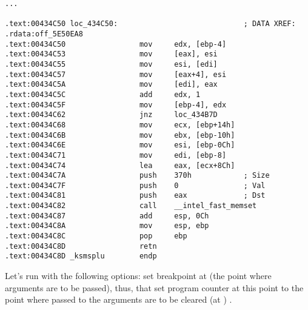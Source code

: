 \begin{lstlisting}[caption=ksm.o]
...

.text:00434C50 loc_434C50:                             ; DATA XREF: .rdata:off_5E50EA8
.text:00434C50                 mov     edx, [ebp-4]
.text:00434C53                 mov     [eax], esi
.text:00434C55                 mov     esi, [edi]
.text:00434C57                 mov     [eax+4], esi
.text:00434C5A                 mov     [edi], eax
.text:00434C5C                 add     edx, 1
.text:00434C5F                 mov     [ebp-4], edx
.text:00434C62                 jnz     loc_434B7D
.text:00434C68                 mov     ecx, [ebp+14h]
.text:00434C6B                 mov     ebx, [ebp-10h]
.text:00434C6E                 mov     esi, [ebp-0Ch]
.text:00434C71                 mov     edi, [ebp-8]
.text:00434C74                 lea     eax, [ecx+8Ch]
.text:00434C7A                 push    370h            ; Size
.text:00434C7F                 push    0               ; Val
.text:00434C81                 push    eax             ; Dst
.text:00434C82                 call    __intel_fast_memset
.text:00434C87                 add     esp, 0Ch
.text:00434C8A                 mov     esp, ebp
.text:00434C8C                 pop     ebp
.text:00434C8D                 retn
.text:00434C8D _ksmsplu        endp
\end{lstlisting}


{Let's run \tracer with the following options: set breakpoint at  (the point where  arguments are to be passed), thus, that \tracer set program counter  at this point to the point where passed to the  arguments are to be cleared (at )}
   .

